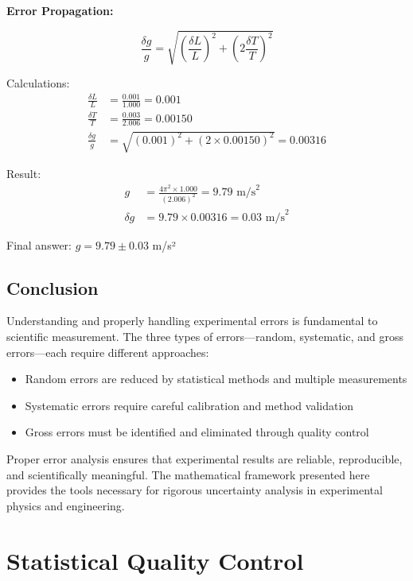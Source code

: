 \documentclass[twoside]{book}
\begin{document}
\textbf{Error Propagation:}

\begin{equation}
\frac{\delta g}{g} = \sqrt{\left(\frac{\delta L}{L}\right)^2 + \left(2\frac{\delta T}{T}\right)^2}
\end{equation}

Calculations:
\begin{align}
\frac{\delta L}{L} &= \frac{0.001}{1.000} = 0.001 \\
\frac{\delta T}{T} &= \frac{0.003}{2.006} = 0.00150 \\
\frac{\delta g}{g} &= \sqrt{(0.001)^2 + (2 \times 0.00150)^2} = 0.00316
\end{align}

Result:
\begin{align}
g &= \frac{4\pi^2 \times 1.000}{(2.006)^2} = 9.79 \text{ m/s}^2 \\
\delta g &= 9.79 \times 0.00316 = 0.03 \text{ m/s}^2
\end{align}

Final answer: $g = 9.79 \pm 0.03$ m/s²

\section{Conclusion}

Understanding and properly handling experimental errors is fundamental to scientific measurement. The three types of errors—random, systematic, and gross errors—each require different approaches:

\begin{itemize}
\item Random errors are reduced by statistical methods and multiple measurements
\item Systematic errors require careful calibration and method validation
\item Gross errors must be identified and eliminated through quality control
\end{itemize}

Proper error analysis ensures that experimental results are reliable, reproducible, and scientifically meaningful. The mathematical framework presented here provides the tools necessary for rigorous uncertainty analysis in experimental physics and engineering.

\chapter{Statistical Quality Control}
\end{document}
